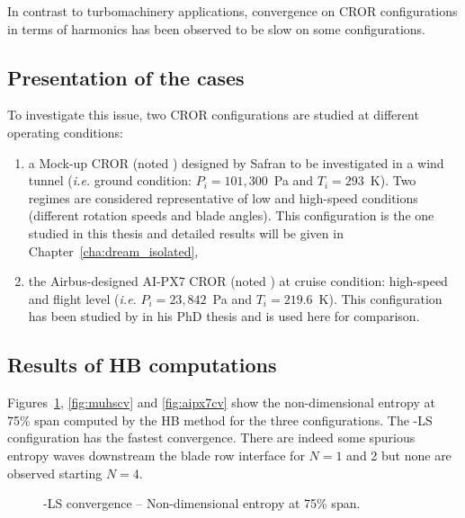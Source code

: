 
In contrast to turbomachinery applications, convergence
on CROR configurations
in terms of harmonics has been observed to be
slow on some configurations.

\subsection{Presentation of the cases}

To investigate this issue, two CROR configurations are studied at
different operating conditions:
\begin{enumerate}
\item a Mock-up CROR (noted \mockup) designed by Safran to be
  investigated in a wind tunnel (\emph{i.e.} ground condition:
  $P_i=101,300$~Pa and $T_i=293$~K). Two regimes are considered
  representative of low and high-speed conditions (different rotation
  speeds and blade angles). This configuration is the one
  studied in this thesis and detailed results will be given 
  in Chapter~\ref{cha:dream_isolated},
\item the Airbus-designed AI-PX7 CROR (noted \aipx) at cruise
  condition: high-speed 
  and flight level (\emph{i.e.}  $P_i=23,842$~Pa and
  $T_i=219.6$~K). This configuration has been studied by
  \citet{ThesisFrancois} in his PhD thesis and is used
  here for comparison.
\end{enumerate}

\subsection{Results of HB computations}

Figures~\ref{fig:mulscv},
\ref{fig:muhscv} and \ref{fig:aipx7cv} show the non-dimensional
entropy at 75\% span computed by the HB method for the three
configurations. The \mockup-LS configuration has the fastest
convergence. There are indeed some spurious entropy waves downstream the blade
row interface for $N=1$ and 2 but none are observed
starting $N=4$.
\begin{figure}[htb]
  \centering
  \caption{\mockup-LS convergence -- Non-dimensional entropy at 75\% span.}
  \label{fig:mulscv}
\end{figure}

